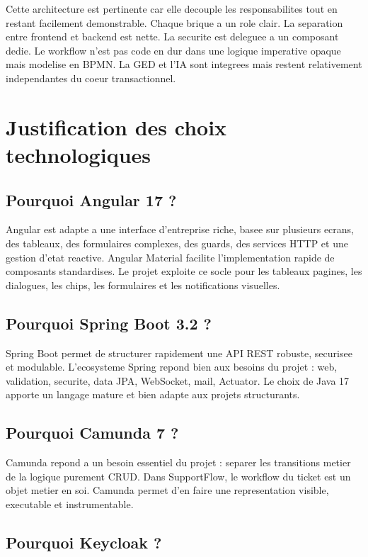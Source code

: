 \documentclass[12pt,a4paper,oneside]{report}
\begin{document}
Cette architecture est pertinente car elle decouple les responsabilites tout en restant facilement demonstrable. Chaque brique a un role clair. La separation entre frontend et backend est nette. La securite est deleguee a un composant dedie. Le workflow n'est pas code en dur dans une logique imperative opaque mais modelise en BPMN. La GED et l'IA sont integrees mais restent relativement independantes du coeur transactionnel.

\section{Justification des choix technologiques}

\subsection{Pourquoi Angular 17 ?}

Angular est adapte a une interface d'entreprise riche, basee sur plusieurs ecrans, des tableaux, des formulaires complexes, des guards, des services HTTP et une gestion d'etat reactive. Angular Material facilite l'implementation rapide de composants standardises. Le projet exploite ce socle pour les tableaux pagines, les dialogues, les chips, les formulaires et les notifications visuelles.

\subsection{Pourquoi Spring Boot 3.2 ?}

Spring Boot permet de structurer rapidement une API REST robuste, securisee et modulable. L'ecosysteme Spring repond bien aux besoins du projet : web, validation, securite, data JPA, WebSocket, mail, Actuator. Le choix de Java 17 apporte un langage mature et bien adapte aux projets structurants.

\subsection{Pourquoi Camunda 7 ?}

Camunda repond a un besoin essentiel du projet : separer les transitions metier de la logique purement CRUD. Dans SupportFlow, le workflow du ticket est un objet metier en soi. Camunda permet d'en faire une representation visible, executable et instrumentable.

\subsection{Pourquoi Keycloak ?}
\end{document}
